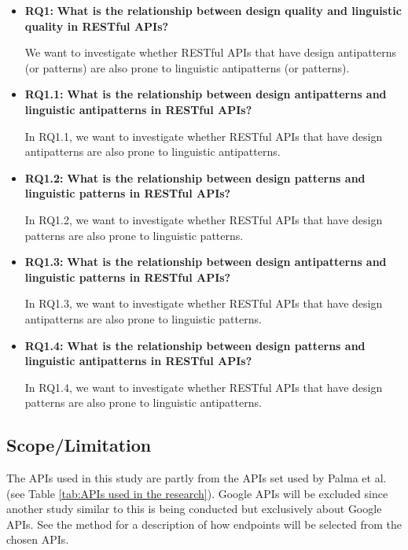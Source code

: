 \documentclass[a4paper,12pt]{article}
\begin{document}
\begin{itemize}
\item \textbf{RQ1:} \textbf{What is the relationship between design quality and linguistic quality in RESTful APIs?}

We want to investigate whether RESTful APIs that have design antipatterns (or patterns) are also prone to linguistic antipatterns (or patterns).

\item \textbf{RQ1.1:} \textbf{What is the relationship between design antipatterns and linguistic antipatterns in RESTful APIs?}

In RQ1.1, we want to investigate whether RESTful APIs that have design antipatterns are also prone to linguistic antipatterns.

\item \textbf{RQ1.2:} \textbf{What is the relationship between design patterns and linguistic patterns in RESTful APIs?}

In RQ1.2, we want to investigate whether RESTful APIs that have design patterns are also prone to linguistic patterns.

\item  \textbf{RQ1.3:} \textbf{What is the relationship between design antipatterns and linguistic patterns in RESTful APIs?}

In RQ1.3, we want to investigate whether RESTful APIs that have design antipatterns are also prone to linguistic patterns.

\item  \textbf{RQ1.4:} \textbf{What is the relationship between design patterns and linguistic antipatterns in RESTful APIs?}

In RQ1.4, we want to investigate whether RESTful APIs that have design patterns are also prone to linguistic antipatterns.

\end{itemize}



\subsection{Scope/Limitation}
The APIs used in this study are partly from the APIs set used by Palma et al. \cite{linguistic} (see Table \ref{tab:APIs used in the research}). Google APIs will be excluded since another study similar to this is being conducted but exclusively about Google APIs. See the method for a description of how endpoints will be selected from the chosen APIs.
\end{document}
